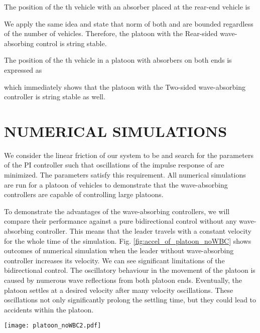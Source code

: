 \documentclass[final,5p,times,twocolumn]{elsarticle}
\begin{document}
The position of the th vehicle with an absorber placed at the rear-end vehicle is

We apply the same idea and state that  norm of both  and  are bounded regardless of the number of vehicles. Therefore, the platoon with the Rear-sided wave-absorbing control is  string stable.

The position of the th vehicle in a platoon with absorbers on both ends is expressed as

which immediately shows that the platoon with the Two-sided wave-absorbing controller is  string stable as well.


\section{NUMERICAL SIMULATIONS}
We consider the linear friction of our system to be  and search for the parameters of the PI controller such that oscillations of the impulse response of  are minimized. The parameters  satisfy this requirement. All numerical simulations are run for a platoon of  vehicles to demonstrate that the wave-absorbing controllers are capable of controlling large platoons.

To demonstrate the advantages of the wave-absorbing controllers, we will compare their performance against a pure bidirectional control without any wave-absorbing controller. This means that the leader travels with a constant velocity  for the whole time of the simulation. Fig. \ref{fig:accel_of_platoon_noWBC} shows outcomes of numerical simulation when the leader without wave-absorbing controller increases its velocity. We can see significant limitations of the bidirectional control. The oscillatory behaviour in the movement of the platoon is caused by numerous wave reflections from both platoon ends. Eventually, the platoon settles at a desired velocity after many velocity oscillations. These oscillations not only significantly prolong the settling time, but they could lead to accidents within the platoon.

\begin{figure*}[!htbp]
 \centering
   \texttt{[image: platoon\_noWBC2.pdf]}
  \caption{Simulation of the platoon without the wave-absorbing controller when the leader accelerates to velocity . The reference distance is kept fixed, , for the whole time.}
  \label{fig:accel_of_platoon_noWBC}
\end{figure*}
\end{document}
